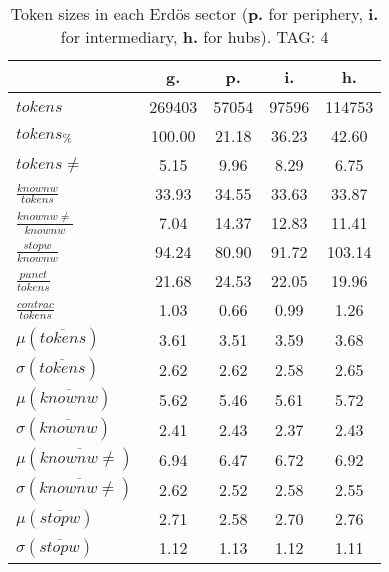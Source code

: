 \begin{table}[h!]
\begin{center}
\begin{tabular}{| l || c | c | c | c |}\hline
 & {\bf g.} & {\bf p.} & {\bf i.} & {\bf h.} \\\hline\hline
$tokens$ & 269403  & 57054  & 97596  & 114753 \\
$tokens_{\%}$ & 100.00  & 21.18  & 36.23  & 42.60 \\
$tokens \neq$ & 5.15  & 9.96  & 8.29  & 6.75 \\\hline
$\frac{knownw}{tokens}$ & 33.93  & 34.55  & 33.63  & 33.87 \\
$\frac{knownw \neq}{knownw}$ & 7.04  & 14.37  & 12.83  & 11.41 \\\hline
$\frac{stopw}{knownw}$ & 94.24  & 80.90  & 91.72  & 103.14 \\
$\frac{punct}{tokens}$ & 21.68  & 24.53  & 22.05  & 19.96 \\
$\frac{contrac}{tokens}$ & 1.03  & 0.66  & 0.99  & 1.26 \\\hline\hline
$\mu(\overline{tokens})$ & 3.61  & 3.51  & 3.59  & 3.68 \\
$\sigma(\overline{tokens})$ & 2.62  & 2.62  & 2.58  & 2.65 \\\hline
$\mu(\overline{knownw})$ & 5.62  & 5.46  & 5.61  & 5.72 \\
$\sigma(\overline{knownw})$ & 2.41  & 2.43  & 2.37  & 2.43 \\\hline
$\mu(\overline{knownw \neq})$ & 6.94  & 6.47  & 6.72  & 6.92 \\
$\sigma(\overline{knownw \neq})$ & 2.62  & 2.52  & 2.58  & 2.55 \\\hline
$\mu(\overline{stopw})$ & 2.71  & 2.58  & 2.70  & 2.76 \\
$\sigma(\overline{stopw})$ & 1.12  & 1.13  & 1.12  & 1.11 \\\hline
\end{tabular}
\caption{Token sizes in each Erd\"os sector ({{\bf p.}} for periphery, {{\bf i.}} for intermediary, {{\bf h.}} for hubs). TAG: 4}
\end{center}
\end{table}